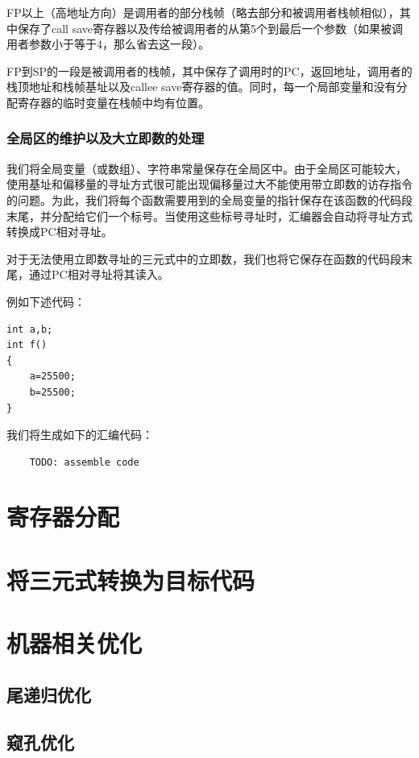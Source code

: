 FP以上（高地址方向）是调用者的部分栈帧（略去部分和被调用者栈帧相似），其中保存了call save寄存器以及传给被调用者的从第5个到最后一个参数（如果被调用者参数小于等于4，那么省去这一段）。

FP到SP的一段是被调用者的栈帧，其中保存了调用时的PC，返回地址，调用者的栈顶地址和栈帧基址以及callee save寄存器的值。同时，每一个局部变量和没有分配寄存器的临时变量在栈帧中均有位置。


\subsubsection{全局区的维护以及大立即数的处理}
我们将全局变量（或数组）、字符串常量保存在全局区中。由于全局区可能较大，使用基址和偏移量的寻址方式很可能出现偏移量过大不能使用带立即数的访存指令的问题。为此，我们将每个函数需要用到的全局变量的指针保存在该函数的代码段末尾，并分配给它们一个标号。当使用这些标号寻址时，汇编器会自动将寻址方式转换成PC相对寻址。

对于无法使用立即数寻址的三元式中的立即数，我们也将它保存在函数的代码段末尾，通过PC相对寻址将其读入。

例如下述代码：
\begin{lstlisting}
int a,b;
int f()
{
	a=25500;
	b=25500;
}

\end{lstlisting}
我们将生成如下的汇编代码：
\begin{verbatim}
	TODO: assemble code
\end{verbatim}
\section{寄存器分配}

\section{将三元式转换为目标代码}

\section{机器相关优化}
\subsection{尾递归优化}
\subsection{窥孔优化}
